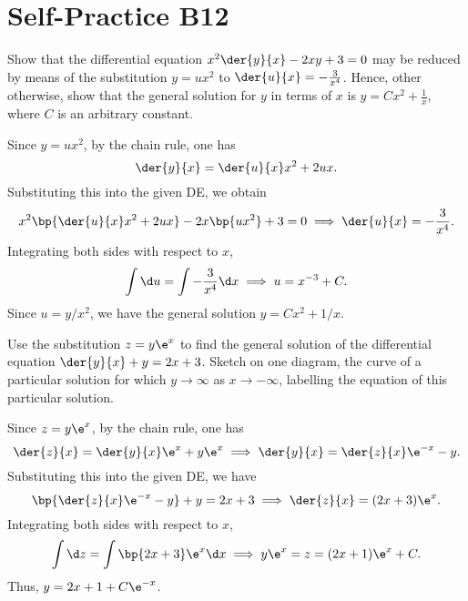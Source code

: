 \section{Self-Practice B12}

\begin{problem}
    Show that the differential equation $x^2 \der{y}{x} - 2xy + 3 = 0$ may be reduced by means of the substitution $y = ux^2$ to $\der{u}{x} = -\frac3{x^4}$. Hence, other otherwise, show that the general solution for $y$ in terms of $x$ is $y = Cx^2 + \frac1x$, where $C$ is an arbitrary constant.
\end{problem}
\begin{solution}
    Since $y = ux^2$, by the chain rule, one has \[\der{y}{x} = \der{u}{x} x^2 + 2ux.\] Substituting this into the given DE, we obtain \[x^2 \bp{\der{u}{x} x^2 + 2ux} - 2x\bp{ux^2} + 3 = 0 \implies \der{u}{x} = -\frac3{x^4}.\] Integrating both sides with respect to $x$, \[\int \d u = \int -\frac3{x^4} \d x \implies u = x^{-3} + C.\] Since $u = y/x^2$, we have the general solution $y = Cx^2 + 1/x$.
\end{solution}

\begin{problem}
    Use the substitution $z = y \e^x$ to find the general solution of the differential equation $\der{y}{x} + y = 2x + 3$. Sketch on one diagram, the curve of a particular solution for which $y \to \infty$ as $x \to -\infty$, labelling the equation of this particular solution.
\end{problem}
\begin{solution}
    Since $z = y\e^{x}$, by the chain rule, one has \[\der{z}{x} = \der{y}{x} \e^x + y\e^{x} \implies \der{y}{x} = \der{z}{x} \e^{-x} - y.\] Substituting this into the given DE, we have \[\bp{\der{z}{x}\e^{-x} - y} + y = 2x + 3 \implies \der{z}{x} = (2x+3)\e^x.\] Integrating both sides with respect to $x$, \[\int \d z = \int \bp{2x+3} \e^x \d x \implies y\e^x = z = (2x+1) \e^x + C.\] Thus, $y = 2x+1 + C\e^{-x}$.

    \begin{figure}[H]
    \centering
    \end{figure}
\end{solution}

